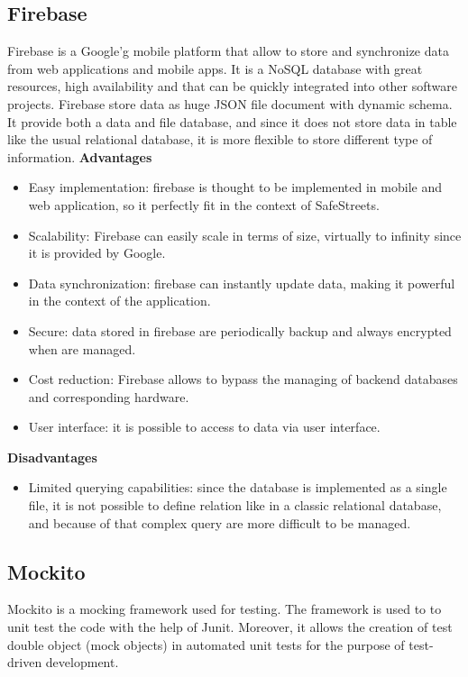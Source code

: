 \documentclass[../ITD.tex]{subfiles}
\begin{document}
    \subsection{Firebase}\label{subsec:firebase}
    Firebase is a Google'g mobile platform that allow to store and synchronize data from web applications and mobile apps.
    It is a NoSQL database with great resources, high availability and that can be quickly integrated into other software projects.
    Firebase store data as huge JSON file document with dynamic schema.
    It provide both a data and file database, and since it does not store data in table like the usual relational database, it is more flexible to store different type of information.
    \newline
    \textbf{Advantages}
    \begin{itemize}
        \item Easy implementation: firebase is thought to be implemented in mobile and web application, so it perfectly fit in the context of SafeStreets.
        \item Scalability: Firebase can easily scale in terms of size, virtually to infinity since it is provided by Google.
        \item Data synchronization: firebase can instantly update data, making it powerful in the context of the application.
        \item Secure: data stored in firebase are periodically backup and always encrypted when are managed.
        \item Cost reduction: Firebase allows to bypass the managing of backend databases and corresponding hardware.
        \item User interface: it is possible to access to data via user interface.
    \end{itemize}
    \textbf{Disadvantages}
    \begin{itemize}
        \item Limited querying capabilities: since the database is implemented as a single file, it is not possible to define relation like in a classic relational database, and because of that complex query are more difficult to be managed.
    \end{itemize}

    \subsection{Mockito}\label{subsec:mokito}
    Mockito is a mocking framework used for testing.
    The framework is used to to unit test the code with the help of Junit.
    Moreover, it allows the creation of test double object (mock objects) in automated unit tests for the purpose of test-driven development.
\end{document}
